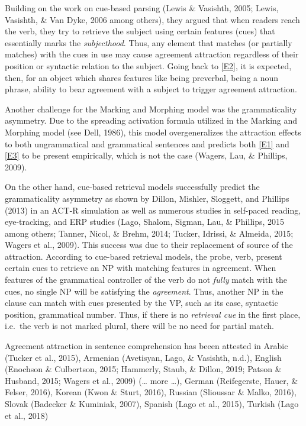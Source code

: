 \documentclass[doc]{apa6}
\begin{document}
Building on the work on cue-based parsing (Lewis \& Vasishth, 2005; Lewis, Vasishth, \& Van Dyke, 2006 among others), they argued that when readers reach the verb, they try to retrieve the subject using certain features (cues) that essentially marks the \emph{subjecthood}. Thus, any element that matches (or partially matches) with the cues in use may cause agreement attraction regardless of their position or syntactic relation to the subject. Going back to \autoref{E2}, it is expected, then, for an object which shares features like being preverbal, being a noun phrase, ability to bear agreement with a subject to trigger agreement attraction.

Another challenge for the Marking and Morphing model was the grammaticality asymmetry. Due to the spreading activation formula
utilized in the Marking and Morphing model (see Dell, 1986), this model overgeneralizes the attraction effects to both ungrammatical and grammatical sentences and predicts both \autoref{E1} and \autoref{E3} to be present empirically, which is not the case (Wagers, Lau, \& Phillips, 2009).

\begin{exe}
\label{E3}
\end{exe}

On the other hand, cue-based retrieval models successfully predict the grammaticality asymmetry as shown by Dillon, Mishler, Sloggett, and Phillips (2013) in an ACT-R simulation as well as numerous studies in self-paced reading, eye-tracking, and ERP studies (Lago, Shalom, Sigman, Lau, \& Phillips, 2015 among others; Tanner, Nicol, \& Brehm, 2014; Tucker, Idrissi, \& Almeida, 2015; Wagers et al., 2009). This success was due to their replacement of source of the attraction. According to cue-based retrieval models, the probe, verb, present certain cues to retrieve an NP with matching features in agreement. When features of the grammatical controller of the verb do not \emph{fully} match with the cues, no single NP will be satisfying the \emph{agreement}. Thus, another NP in the clause can match with cues presented by the VP, such as its case, syntactic position, grammatical number. Thus, if there is no \emph{retrieval cue} in the first place, i.e.~the verb is not marked plural, there will be no need for partial match.

Agreement attraction in sentence comprehension has beeen attested in
Arabic (Tucker et al., 2015),
Armenian (Avetisyan, Lago, \& Vasishth, n.d.),
English (Enochson \& Culbertson, 2015; Hammerly, Staub, \& Dillon, 2019; Patson \& Husband, 2015; Wagers et al., 2009) (\ldots{} more \ldots{}),
German (Reifegerste, Hauer, \& Felser, 2016),
Korean (Kwon \& Sturt, 2016),
Russian (Slioussar \& Malko, 2016),
Slovak (Badecker \& Kuminiak, 2007),
Spanish (Lago et al., 2015),
Turkish (Lago et al., 2018)
\end{document}
